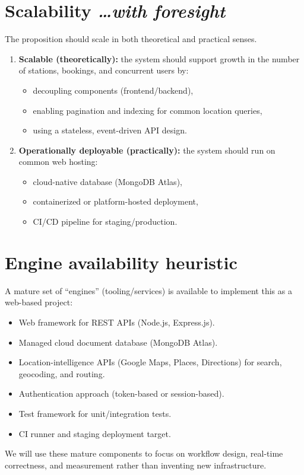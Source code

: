 \documentclass[11pt,a4paper]{article}
\newcommand{\BvrHint}[1]{%
  {\normalfont\normalsize\itshape\hfill #1}}
\begin{document}
\section{Scalability %
\BvrHint{\ldots with foresight}}
The proposition should scale in both theoretical and
practical senses.

\begin{enumerate}[leftmargin=0.7cm]
    \item \textbf{Scalable (theoretically):} the system should support growth in the number of stations, bookings, and concurrent users by:
    \begin{itemize}[leftmargin=0.7cm]
        \item decoupling components (frontend/backend),
        \item enabling pagination and indexing for common location queries,
        \item using a stateless, event-driven API design.
    \end{itemize}
    
    \item \textbf{Operationally deployable (practically):} the system should run on common web hosting:
    \begin{itemize}[leftmargin=0.7cm]
        \item cloud-native database (MongoDB Atlas),
        \item containerized or platform-hosted deployment,
        \item CI/CD pipeline for staging/production.
    \end{itemize}
\end{enumerate}

\section{Engine availability heuristic}
A mature set of ``engines'' (tooling/services) is available
to implement this as a web-based project:
\begin{itemize}[leftmargin=0.7cm]
    \item Web framework for REST APIs (Node.js, Express.js).
    \item Managed cloud document database (MongoDB Atlas).
    \item Location-intelligence APIs (Google Maps, Places, Directions) for search, geocoding, and routing.
    \item Authentication approach (token-based or session-based).
    \item Test framework for unit/integration tests.
    \item CI runner and staging deployment target.
\end{itemize}
We will use these mature components to focus on workflow
design, real-time correctness, and measurement rather than
inventing new infrastructure.
\end{document}
